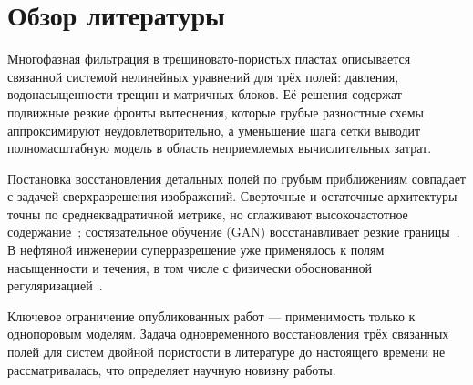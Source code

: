 \chapter{Обзор литературы}
\label{chap:lr}

Многофазная фильтрация в трещиновато-пористых пластах описывается связанной системой нелинейных уравнений для трёх полей: давления, водонасыщенности трещин и матричных блоков. Её решения содержат подвижные резкие фронты вытеснения, которые грубые разностные схемы аппроксимируют неудовлетворительно, а уменьшение шага сетки выводит полномасштабную модель в область неприемлемых вычислительных затрат.

Постановка восстановления детальных полей по грубым приближениям совпадает с задачей сверхразрешения изображений. Сверточные и остаточные архитектуры точны по среднеквадратичной метрике, но сглаживают высокочастотное содержание~\autocite{lim2017enhanced}; состязательное обучение (GAN) восстанавливает резкие границы~\autocite{cvf_srgan}. В нефтяной инженерии суперразрешение уже применялось к полям насыщенности и течения, в том числе с физически обоснованной регуляризацией~\autocite{li2025spe}.

Ключевое ограничение опубликованных работ — применимость только к однопоровым моделям. Задача одновременного восстановления трёх связанных полей для систем двойной пористости в литературе до настоящего времени не рассматривалась, что определяет научную новизну работы.